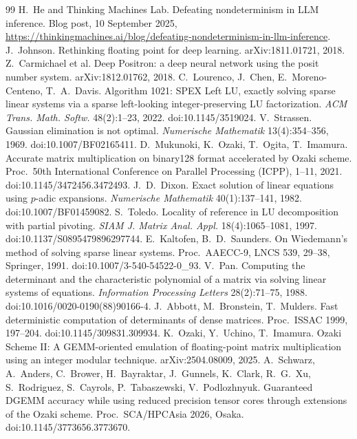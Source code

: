 \documentclass[11pt]{article}
\begin{document}
\begin{thebibliography}{99}
 H.~He and Thinking Machines Lab. Defeating nondeterminism in LLM inference. Blog post, 10 September 2025, \url{https://thinkingmachines.ai/blog/defeating-nondeterminism-in-llm-inference}.
 J.~Johnson. Rethinking floating point for deep learning. arXiv:1811.01721, 2018.
 Z.~Carmichael et al. Deep Positron: a deep neural network using the posit number system. arXiv:1812.01762, 2018.
 C.~Lourenco, J.~Chen, E.~Moreno-Centeno, T.~A.~Davis. Algorithm 1021: SPEX Left LU, exactly solving sparse linear
systems via a sparse left-looking integer-preserving LU factorization. \emph{ACM Trans. Math. Softw.} 48(2):1--23, 2022.
doi:10.1145/3519024.
 V.~Strassen. Gaussian elimination is not optimal. \emph{Numerische Mathematik} 13(4):354--356, 1969.
doi:10.1007/BF02165411.
 D.~Mukunoki, K.~Ozaki, T.~Ogita, T.~Imamura. Accurate matrix multiplication on binary128 format
accelerated by Ozaki scheme. Proc.\ 50th International Conference on Parallel Processing (ICPP), 1--11, 2021.
doi:10.1145/3472456.3472493.
 J.~D.~Dixon. Exact solution of linear equations using $p$-adic expansions. \emph{Numerische Mathematik}
40(1):137--141, 1982. doi:10.1007/BF01459082.
 S.~Toledo. Locality of reference in LU decomposition with partial pivoting. \emph{SIAM J. Matrix Anal.
Appl.} 18(4):1065--1081, 1997. doi:10.1137/S0895479896297744.
 E.~Kaltofen, B.~D.~Saunders. On Wiedemann's method of solving sparse linear systems. Proc.\ AAECC-9, LNCS
539, 29--38, Springer, 1991. doi:10.1007/3-540-54522-0\_93.
 V.~Pan. Computing the determinant and the characteristic polynomial of a matrix via solving linear systems
of equations. \emph{Information Processing Letters} 28(2):71--75, 1988. doi:10.1016/0020-0190(88)90166-4.
 J.~Abbott, M.~Bronstein, T.~Mulders. Fast deterministic computation of determinants of dense matrices.
Proc.\ ISSAC 1999, 197--204. doi:10.1145/309831.309934.
 K.~Ozaki, Y.~Uchino, T.~Imamura. Ozaki Scheme II: A GEMM-oriented emulation of floating-point matrix
multiplication using an integer modular technique. arXiv:2504.08009, 2025.
 A.~Schwarz, A.~Anders, C.~Brower, H.~Bayraktar, J.~Gunnels, K.~Clark, R.~G.~Xu, S.~Rodriguez, S.~Cayrols,
P.~Tabaszewski, V.~Podlozhnyuk. Guaranteed DGEMM accuracy while using reduced precision tensor cores through extensions of
the Ozaki scheme. Proc.\ SCA/HPCAsia 2026, Osaka. doi:10.1145/3773656.3773670.

\end{thebibliography}
\end{document}
